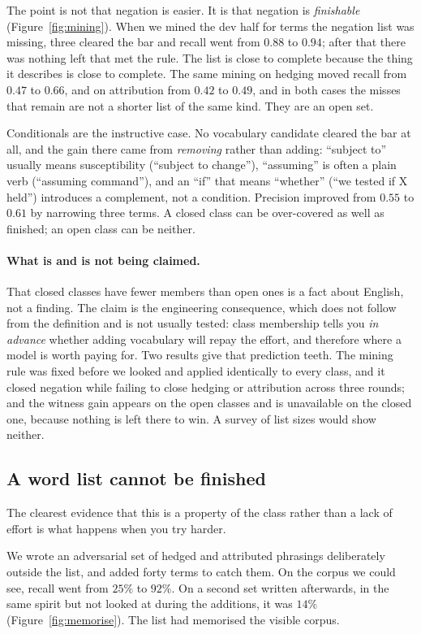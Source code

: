 \documentclass[11pt]{article}
\begin{document}
The point is not that negation is easier. It is that negation is \emph{finishable}
(Figure~\ref{fig:mining}). When
we mined the dev half for terms the negation list was missing, three cleared the bar and
recall went from $0.88$ to $0.94$; after that there was nothing left that met the rule.
The list is close to complete because the thing it describes is close to complete. The
same mining on hedging moved recall from $0.47$ to $0.66$, and on attribution from $0.42$
to $0.49$, and in both cases the misses that remain are not a shorter list of the same
kind. They are an open set.

Conditionals are the instructive case. No vocabulary candidate cleared the bar at all, and
the gain there came from \emph{removing} rather than adding: ``subject to'' usually means
susceptibility (``subject to change''), ``assuming'' is often a plain verb (``assuming
command''), and an ``if'' that means ``whether'' (``we tested if X held'') introduces a
complement, not a condition. Precision improved from $0.55$ to $0.61$ by narrowing three
terms. A closed class can be over-covered as well as finished; an open class can be
neither.

\paragraph{What is and is not being claimed.} That closed classes have fewer members
than open ones is a fact about English, not a finding. The claim is the engineering
consequence, which does not follow from the definition and is not usually tested: class
membership tells you \emph{in advance} whether adding vocabulary will repay the effort,
and therefore where a model is worth paying for. Two results give that prediction teeth.
The mining rule was fixed before we looked and applied identically to every class, and
it closed negation while failing to close hedging or attribution across three rounds;
and the witness gain appears on the open classes and is unavailable on the closed one,
because nothing is left there to win. A survey of list sizes would show neither.

\subsection{A word list cannot be finished}
The clearest evidence that this is a property of the class rather than a lack of effort is
what happens when you try harder.

We wrote an adversarial set of hedged and attributed phrasings deliberately outside the
list, and added forty terms to catch them. On the corpus we could see, recall went from
$25\%$ to $92\%$. On a second set written afterwards, in the same spirit but not looked at
during the additions, it was $14\%$ (Figure~\ref{fig:memorise}). The list had memorised
the visible corpus.
\end{document}
